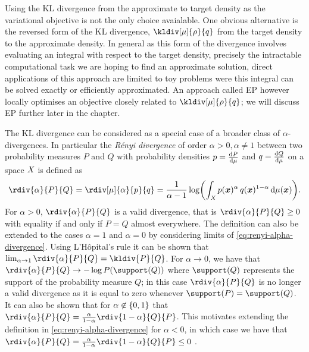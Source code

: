 Using the \ac{KL} divergence from the approximate to target density as the variational objective is not the only choice avaialable. One obvious alternative is the reversed form of the \ac{KL} divergence, $\kldiv[\mu]{\rho}{q}$ from the target density to the approximate density. In general as this form of the divergence involves evaluating an integral with respect to the target density, precisely the intractable computational task we are hoping to find an approximate solution, direct applications of this approach are limited to toy problems were this integral can be solved exactly or efficiently approximated. An approach called \ac{EP} \citep{minka2001expectation} however locally optimises an objective closely related to $\kldiv[\mu]{\rho}{q}$; we will discuss \ac{EP} further later in the chapter.

The \ac{KL} divergence can be considered as a special case of a broader class of $\alpha$-divergences. In particular the \emph{R\'{e}nyi divergence} \citep{renyi1961measures,van2014renyi} of order $\alpha > 0, \alpha \neq 1$ between two probability measures $P$ and $Q$ with probability densities $p = \frac{\mathrm{d} P}{\mathrm{d} \mu}$ and $q = \frac{\mathrm{d} Q}{\mathrm{d} \mu}$ on a space $\mathit{X}$ is defined as
\begin{equation}\label{eq:renyi-alpha-divergence}
  \rdiv{\alpha}{P}{Q} =
  \rdiv[\mu]{\alpha}{p}{q} =
  \frac{1}{\alpha -1} \log \lpa \int_{\set{X}} p(\vct{x})^\alpha\,q(\vct{x})^{1-\alpha}\,\dr\mu(\vct{x})\rpa.
\end{equation}
For $\alpha > 0$, $\rdiv{\alpha}{P}{Q}$ is a valid divergence, that is $\rdiv{\alpha}{P}{Q} \geq 0$ with equality if and only if $P = Q$ almost everywhere. The definition can also be extended to the cases $\alpha = 1$ and $\alpha=0$ by considering limits of \eqref{eq:renyi-alpha-divergence}. Using L'H\^{o}pital's rule it can be shown that $\lim_{\alpha \to 1} \rdiv{\alpha}{P}{Q} = \kldiv{P}{Q}$. For $\alpha \to 0$, we have that $\rdiv{\alpha}{P}{Q} \to -\log P\lpa\support(Q)\rpa$ where $\support(Q)$ represents the support of the probability measure $Q$; in this case $\rdiv{\alpha}{P}{Q}$ is no longer a valid divergence as it is equal to zero whenever $\support(P) = \support(Q)$. It can also be shown that for $\alpha \not\in \fset{0,1}$ that $\rdiv{\alpha}{P}{Q} = \frac{\alpha}{1-\alpha}\rdiv{1-\alpha}{Q}{P}$. This motivates extending the definition in \eqref{eq:renyi-alpha-divergence} for $\alpha < 0$, in which case we have that $\rdiv{\alpha}{P}{Q} = \frac{\alpha}{1-\alpha}\rdiv{1-\alpha}{Q}{P} \leq 0$ \citep{li2016renyi}.

